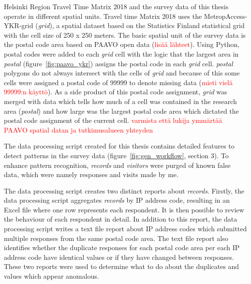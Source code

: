 Helsinki Region Travel Time Matrix 2018 and the survey data of this thesis operate in different spatial units. Travel time Matrix 2018 uses the MetropAccess-YKR-grid (\textit{grid}), a spatial dataset based on the Statistics Finland statistical grid with the cell size of 250 x 250 meters. The basic spatial unit of the survey data is the postal code area based on PAAVO open data (\textcolor{red}{lisää lähteet}). Using Python, postal codes were added to each \textit{grid} cell with the logic that the largest area in \textit{postal} (figure~\ref{fig:paavo_ykr}) assigns the postal code in each \textit{grid} cell. \textit{postal} polygons do not always intersect with the cells of \textit{grid} and because of this some cells were assigned a postal code of 99999 to denote missing data (\textcolor{red}{mieti vielä 99999:n käyttö}). As a side product of this postal code assignment, \textit{grid} was merged with data which tells how much of a cell was contained in the research area (\textit{postal}) and how large was the largest postal code area which dictated the postal code assignment of the current cell. \textcolor{red}{varmista että lukija ymmärtää PAAVO spatial datan ja tutkimusalueen yhteyden}

The data processing script created for this thesis contains detailed features to detect patterns in the survey data (figure~\ref{fig:gen_workflow}, section 3). To enhance pattern recognition, \textit{records} and \textit{visitors} were purged of known false data, which were namely responses and visits made by me.

The data processing script creates two distinct reports about \textit{records}. Firstly, the data processing script aggregates \textit{records} by IP address code, resulting in an Excel file where one row represents each respondent. It is then possible to review the behaviour of each respondent in detail. In addition to this report, the data processing script writes a text file report about IP address codes which submitted multiple responses from the same postal code area. The text file report also identifies whether the duplicate responses for each postal code area per each IP address code have identical values or if they have changed between responses. These two reports were used to determine what to do about the duplicates and values which appear anomalous.


